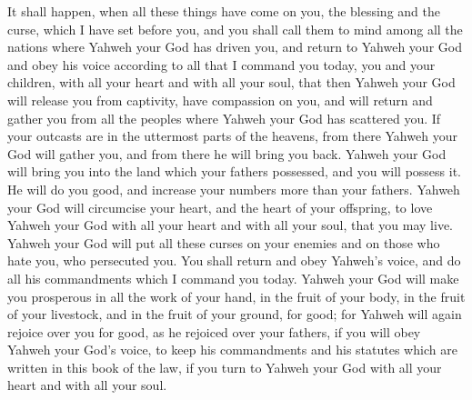  It shall happen, when all these things have come on you,
the blessing and the curse, which I have set before you, and you shall
call them to mind among all the nations where Yahweh your God has driven
you,  and return to Yahweh your God and obey his voice
according to all that I command you today, you and your children, with
all your heart and with all your soul,  that then Yahweh
your God will release you from captivity, have compassion on you, and
will return and gather you from all the peoples where Yahweh your God
has scattered you.  If your outcasts are in the uttermost
parts of the heavens, from there Yahweh your God will gather you, and
from there he will bring you back.  Yahweh your God will
bring you into the land which your fathers possessed, and you will
possess it. He will do you good, and increase your numbers more than
your fathers.  Yahweh your God will circumcise your heart,
and the heart of your offspring, to love Yahweh your God with all your
heart and with all your soul, that you may live.  Yahweh
your God will put all these curses on your enemies and on those who hate
you, who persecuted you.  You shall return and obey
Yahweh's voice, and do all his commandments which I command you today.
 Yahweh your God will make you prosperous in all the work
of your hand, in the fruit of your body, in the fruit of your livestock,
and in the fruit of your ground, for good; for Yahweh will again rejoice
over you for good, as he rejoiced over your fathers,  if
you will obey Yahweh your God's voice, to keep his commandments and his
statutes which are written in this book of the law, if you turn to
Yahweh your God with all your heart and with all your soul.

